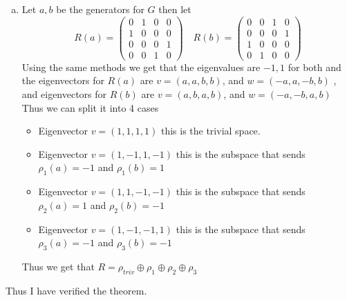 \documentclass[12pt, letterpaper]{article}
\theoremstyle{definition}
\begin{document}
\begin{enumerate}[(a)]
 For \( \lambda_3 = -i \):
The eigenspace is determined by solving \( (R(g) - (-i)I)v = 0 \). Explicitly:
\[
\begin{pmatrix}
i & 0 & 0 & 1 \\
1 & i & 0 & 0 \\
0 & 1 & i & 0 \\
0 & 0 & 1 & i
\end{pmatrix}
\begin{pmatrix}
v_1 \\ v_2 \\ v_3 \\ v_4
\end{pmatrix}
= 0.
\]
The solution gives a vector \( v = (i, -1, -i, 1) \). This corresponds to the irreducible representation \( \rho_{-i} \), where \( g \) acts as multiplication by \( -i \).\\
Thus, the $R = \rho_{triv} \oplus \rho_i \oplus \rho_{-1} \oplus \rho_{-i}$

\item Let $a,b$ be the generators for $G$ then let
\[
R(a)=\begin{pmatrix}
    0 & 1 & 0 & 0\\
    1 & 0 & 0 & 0\\
    0 & 0 & 0 & 1\\
    0 & 0 & 1 & 0
\end{pmatrix}
\quad R(b)=\begin{pmatrix}
    0 & 0 & 1 & 0\\
    0 & 0 & 0 & 1\\
    1 & 0 & 0 & 0\\
    0 & 1 & 0 & 0
\end{pmatrix}
\]
Using the same methods we get that the eigenvalues are $-1,1$ for both and the eigenvectors for $R(a)$ are $v=(a,a,b,b)$, and $w=(-a,a,-b,b)$
, and eigenvectors for $R(b)$ are $v=(a,b,a,b)$, and $w=(-a,-b,a,b)$\\
Thus we can split it into 4 cases\\
\begin{itemize}
    \item Eigenvector $v=(1,1,1,1)$ this is the trivial space.
    \item Eigenvector $v=(1,-1,1,-1)$ this is the subspace that sends $\rho_1(a)=-1$ and $\rho_1(b)=1$
    \item Eigenvector $v=(1,1,-1,-1)$ this is the subspace that sends $\rho_2(a)=1$ and $\rho_2(b)=-1$
    \item Eigenvector $v=(1,-1,-1,1)$ this is the subspace that sends $\rho_3(a)=-1$ and $\rho_3(b)=-1$
\end{itemize}
Thus we get that $R=\rho_{triv} \oplus \rho_1 \oplus \rho_2 \oplus \rho_3$
\end{enumerate}
Thus I have verified the theorem.
\newpage
\end{document}
